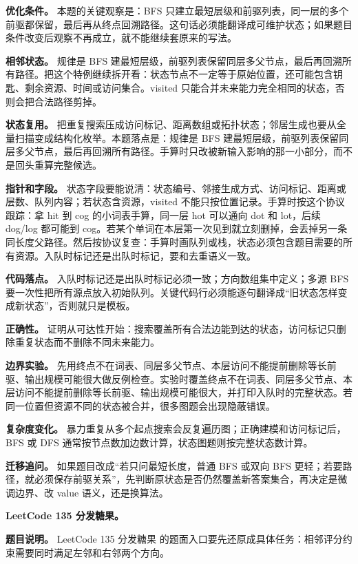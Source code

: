 \textbf{优化条件。} 本题的关键观察是：BFS 只建立最短层级和前驱列表，同一层的多个前驱都保留，最后再从终点回溯路径。这句话必须能翻译成可维护状态；如果题目条件改变后观察不再成立，就不能继续套原来的写法。

\textbf{相邻状态。} 规律是 BFS 建最短层级，前驱列表保留同层多父节点，最后再回溯所有路径。把这个特例继续拆开看：状态节点不一定等于原始位置，还可能包含钥匙、剩余资源、时间或访问集合。visited 只能合并未来能力完全相同的状态，否则会把合法路径剪掉。

\textbf{状态复用。} 把重复搜索压成访问标记、距离数组或拓扑状态；邻居生成也要从全量扫描变成结构化枚举。本题落点是：规律是 BFS 建最短层级，前驱列表保留同层多父节点，最后再回溯所有路径。手算时只改被新输入影响的那一小部分，而不是回头重算完整候选。

\textbf{指针和字段。} 状态字段要能说清：状态编号、邻接生成方式、访问标记、距离或层数、队列内容；若状态含资源，visited 不能只按位置记录。手算时按这个协议跟踪：拿 hit 到 cog 的小词表手算，同一层 hot 可以通向 dot 和 lot，后续 dog/log 都可能到 cog。若某个单词在本层第一次见到就立刻删掉，会丢掉另一条同长度父路径。然后按协议复查：手算时画队列或栈，状态必须包含题目需要的所有资源。入队时标记还是出队时标记，要和去重语义一致。

\textbf{代码落点。} 入队时标记还是出队时标记必须一致；方向数组集中定义；多源 BFS 要一次性把所有源点放入初始队列。关键代码行必须能逐句翻译成“旧状态怎样变成新状态”，否则就只是模板。

\textbf{正确性。} 证明从可达性开始：搜索覆盖所有合法边能到达的状态，访问标记只删除重复状态而不删除不同未来能力。

\textbf{边界实验。} 先用终点不在词表、同层多父节点、本层访问不能提前删除等长前驱、输出规模可能很大做反例检查。实验时覆盖终点不在词表、同层多父节点、本层访问不能提前删除等长前驱、输出规模可能很大，并打印入队时的完整状态。若同一位置但资源不同的状态被合并，很多图题会出现隐蔽错误。

\textbf{复杂度变化。} 暴力重复从多个起点搜索会反复遍历图；正确建模和访问标记后，BFS 或 DFS 通常按节点数加边数计算，状态图题则按完整状态数计算。

\textbf{迁移追问。} 如果题目改成“若只问最短长度，普通 BFS 或双向 BFS 更轻；若要路径，就必须保存前驱关系”，先判断原状态是否仍然覆盖新答案集合，再决定是微调边界、改 value 语义，还是换算法。

\noindent\textbf{LeetCode 135 分发糖果。}

\textbf{题目说明。} LeetCode 135 分发糖果 的题面入口要先还原成具体任务：相邻评分约束需要同时满足左邻和右邻两个方向。

